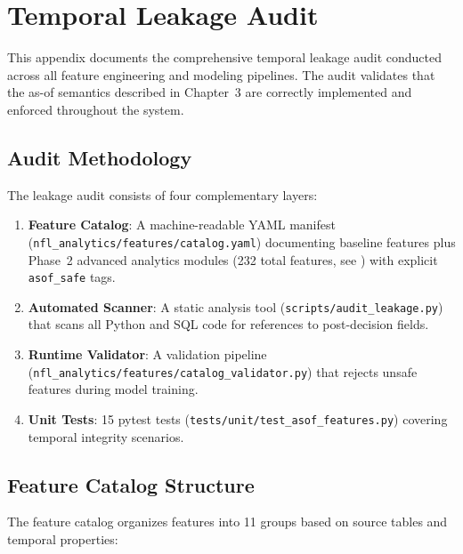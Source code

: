 
\chapter{Temporal Leakage Audit}
\label{app:leakage_audit}

This appendix documents the comprehensive temporal leakage audit conducted across all feature engineering and modeling pipelines. The audit validates that the as-of semantics described in Chapter~3 are correctly implemented and enforced throughout the system.

\section{Audit Methodology}

The leakage audit consists of four complementary layers:

\begin{enumerate}
\item \textbf{Feature Catalog}: A machine-readable YAML manifest (\texttt{nfl\_analytics/\allowbreak features/\allowbreak catalog.yaml}) documenting baseline features plus Phase~2 advanced analytics modules (232 total features, see ) with explicit \texttt{asof\_safe} tags.

\item \textbf{Automated Scanner}: A static analysis tool (\texttt{scripts/audit\_leakage.py}) that scans all Python and SQL code for references to post-decision fields.

\item \textbf{Runtime Validator}: A validation pipeline (\texttt{nfl\_analytics/features/catalog\_validator.py}) that rejects unsafe features during model training.

\item \textbf{Unit Tests}: 15 pytest tests (\texttt{tests/unit/test\_asof\_features.py}) covering temporal integrity scenarios.
\end{enumerate}

\section{Feature Catalog Structure}

The feature catalog organizes features into 11 groups based on source tables and temporal properties:

